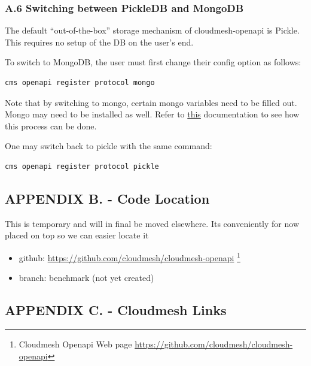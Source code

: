 \hypertarget{a.6-switching-between-pickledb-and-mongodb}{%
\subsubsection{A.6 Switching between PickleDB and
MongoDB}\label{a.6-switching-between-pickledb-and-mongodb}}

The default ``out-of-the-box'' storage mechanism of cloudmesh-openapi is
Pickle. This requires no setup of the DB on the user's end.

To switch to MongoDB, the user must first change their config option as
follows:

\begin{verbatim}
cms openapi register protocol mongo
\end{verbatim}

Note that by switching to mongo, certain mongo variables need to be
filled out. Mongo may need to be installed as well. Refer to
\href{https://github.com/cloudmesh/cloudmesh-openapi/\#installation}{this}
documentation to see how this process can be done.

One may switch back to pickle with the same command:

\begin{verbatim}
cms openapi register protocol pickle
\end{verbatim}

\hypertarget{appendix-b.---code-location}{%
\subsection{APPENDIX B. - Code
Location}\label{appendix-b.---code-location}}

This is temporary and will in final be moved elsewhere. Its conveniently
for now placed on top so we can easier locate it

\begin{itemize}
\tightlist
\item
  github: \url{https://github.com/cloudmesh/cloudmesh-openapi}
  \footnote{Cloudmesh Openapi Web page
    \url{https://github.com/cloudmesh/cloudmesh-openapi}}
\item
  branch: benchmark (not yet created)
\end{itemize}

\hypertarget{appendix-c.---cloudmesh-links}{%
\subsection{APPENDIX C. - Cloudmesh
Links}\label{appendix-c.---cloudmesh-links}}


